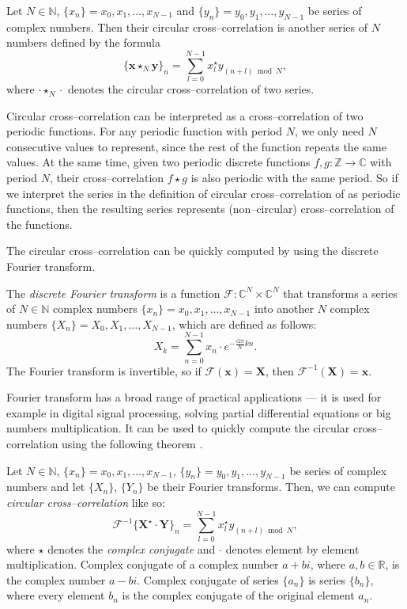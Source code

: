 Let $N \in \mathbb{N}$, $\{x_n\} = x_0, x_1, \dots , x_{N-1}$ and $\{y_n\} = y_0, y_1, \dots , y_{N-1}$ be series of complex numbers. Then their circular cross--correlation is another series of $N$ numbers defined by the formula
\[
\{\mathbf{x} \star_N \mathbf{y}\}_n = \sum_{l=0}^{N-1}x^\star_ly_{(n+l)\bmod N},
\]
where $\cdot \star_N \cdot$ denotes the circular cross--correlation of two series.

Circular cross--correlation can be interpreted as a cross--correlation of two periodic functions. For any periodic function with period $N$, we only need $N$ consecutive values to represent, since the rest of the function repeats the same values. At the same time, given two periodic discrete functions $f, g : \mathbb{Z} \rightarrow \mathbb{C}$ with period $N$, their cross--correlation $f \star g$ is also periodic with the same period. So if we interpret the series in the definition of circular cross--correlation of as periodic functions, then the resulting series represents (non--circular) cross--correlation of the functions.


The circular cross--correlation can be quickly computed by using the discrete Fourier transform.

The \emph{discrete Fourier transform} is a function $\mathcal{F}: \mathbb{C}^N \times \mathbb{C}^N$ that transforms a series of $N \in \mathbb{N}$ complex numbers $\{x_n\} = x_0, x_1, \dots , x_{N-1}$ into another $N$ complex numbers $\{X_n\} = X_0, X_1, \dots , X_{N-1}$, which are defined as follows:
\[
X_k = \sum_{n=0}^{N-1} x_n \cdot e^{-\frac{i2\pi}{N}kn}.
\]
The Fourier transform is invertible, so if $\mathcal{F}(\mathbf{x}) = \mathbf{X}$, then $\mathcal{F}^{-1}(\mathbf{X}) = \mathbf{x}$.

Fourier transform has a broad range of practical applications --- it is used for example in digital signal processing, solving partial differential equations or big numbers multiplication. It can be used to quickly compute the circular cross--correlation using the following theorem \cite{proakis2004digital}.

Let $N \in \mathbb{N}$, $\{x_n\} = x_0, x_1, \dots , x_{N-1}$, $\{y_n\} = y_0, y_1, \dots , y_{N-1}$ be series of complex numbers and let $\{X_n\}$, $\{Y_n\}$ be their Fourier transforms. Then, we can compute \emph{circular cross--correlation} like so: 
\[
\mathcal{F}^{-1}\{\mathbf{X}^\star \cdot \mathbf{Y}\}_n = \sum_{l=0}^{N-1}x^\star_ly_{(n+l)\bmod N},
\]
where $\star$ denotes the \emph{complex conjugate} and $\cdot$ denotes element by element multiplication. Complex conjugate of a complex number $a + bi$, where $a, b \in \mathbb{R}$, is the complex number $a - bi$. Complex conjugate of series $\{a_n\}$ is series $\{b_n\}$, where every element $b_n$ is the complex conjugate of the original element $a_n$.

